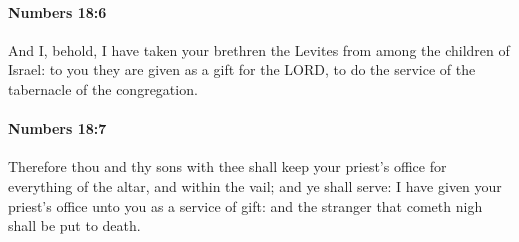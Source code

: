 		\paragraph{Numbers 18:6} %
			\label{NUMBERS-18-6}

			And I, behold, I have taken your brethren the Levites from among the children of Israel: to you they are given as a gift for the LORD, to do the service of the tabernacle of the congregation.


		\paragraph{Numbers 18:7} %
			\label{NUMBERS-18-7}

			Therefore thou and thy sons with thee shall keep your priest’s office for everything of the altar, and within the vail; and ye shall serve: I have given your priest’s office unto you as a service of gift: and the stranger that cometh nigh shall be put to death.

